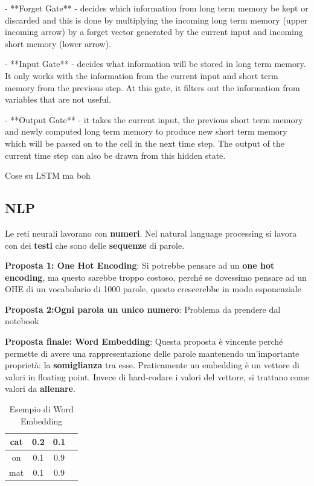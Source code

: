  - **Forget Gate** - decides which information from long term memory be kept or discarded and this is done by multiplying the incoming long term memory (upper incoming arrow) by a forget vector generated by the current input and incoming short memory (lower arrow).

 - **Input Gate** - decides what information will be stored in long term memory. It only works with the information from the current input and short term memory from the previous step. At this gate, it filters out the information from variables that are not useful.


 - **Output Gate** - it takes the current input, the previous short term memory and newly computed long term memory to produce new short term memory which will be passed on to the cell in the next time step. The output of the current time step can also be drawn from this hidden state.


 Cose su LSTM ma boh


 \subsection{NLP}

Le reti neurali lavorano con \textbf{numeri}. Nel natural language processing si lavora con dei \textbf{testi} che sono delle \textbf{sequenze} di parole.

\textbf{Proposta 1: One Hot Encoding}:
Si potrebbe pensare ad un \textbf{one hot encoding}, ma questo sarebbe troppo 
costoso, perché se dovessimo pensare ad un OHE di un vocabolario di 1000 parole, 
questo crescerebbe in modo esponenziale

\textbf{Proposta 2:Ogni parola un unico numero}:
Problema da prendere dal notebook

\textbf{Proposta finale: Word Embedding}: Questa proposta è vincente perché permette di avere 
una rappresentazione delle parole mantenendo un'importante proprietà: la \textbf{somiglianza} tra esse. Praticamente 
un embedding è un vettore di valori in floating point. Invece di hard-codare i valori del vettore, si 
trattano come valori da \textbf{allenare}.


\begin{table}[H]
    \centering
    \begin{tabular}{|c|c|c|c|}
        \hline
        cat & 0.2 & 0.1 & \\
        \hline
        on & 0.1 & 0.9 & \\
        \hline
        mat & 0.1 & 0.9 & \\
        \hline
    \end{tabular}
    \caption{Esempio di Word Embedding}
\end{table}


